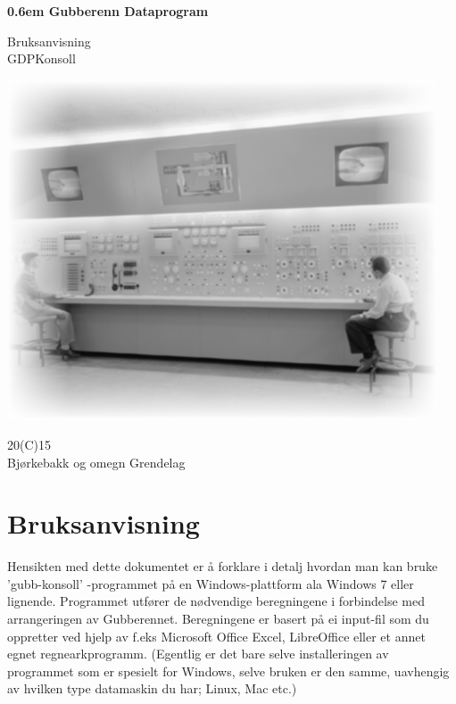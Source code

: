 \documentclass[12pt]{book}
\begin{document}
\rhead{\today}
\rfoot{\thepage}


\clearpage

\newcommand\nbvspace[1][3]{\vspace*{\stretch{#1}}}
\newcommand\nbstretchyspace{\spaceskip0.5em plus 0.25em minus 0.25em}
\newcommand{\nbtitlestretch}{\spaceskip0.6em}
\pagestyle{empty}
\begin{center}
\bfseries
\nbvspace[1]
\Huge
{\nbtitlestretch\huge
Gubberenn Dataprogram \\}

\nbvspace[10]
\normalsize

Bruksanvisning\\
GDPKonsoll\\

\nbvspace[2]

\includegraphics[width=5.0in]{gubb}
\nbvspace[15]
\normalsize

20(C)15\\
\large
Bjørkebakk og omegn Grendelag
\nbvspace[1]
\end{center}

\tableofcontents

\chapter{Bruksanvisning}

Hensikten med dette dokumentet er å forklare i detalj hvordan man kan bruke 'gubb-konsoll' -programmet på en Windows-plattform ala Windows 7 eller lignende. Programmet utfører de nødvendige beregningene i forbindelse med arrangeringen av Gubberennet. Beregningene er basert på ei input-fil som du oppretter ved hjelp av f.eks Microsoft Office Excel,  LibreOffice eller et annet egnet regnearkprogramm.  (Egentlig er det bare selve installeringen av programmet som er spesielt for Windows, selve bruken er den samme, uavhengig av hvilken type datamaskin du har; Linux, Mac etc.)
\end{document}
